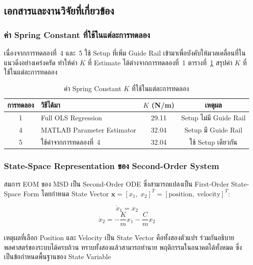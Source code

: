 \subsection{เอกสารและงานวิจัยที่เกี่ยวข้อง}

\subsubsection{ค่า Spring Constant ที่ใช้ในแต่ละการทดลอง}

เนื่องจากการทดลองที่~4 และ~5 ใช้ Setup ที่เพิ่ม Guide Rail
เข้ามาเพื่อบังคับให้มวลเคลื่อนที่ในแนวดิ่งอย่างเคร่งครัด
ทำให้ค่า $K$ ที่ Estimate ได้ต่างจากการทดลองที่~1
ตารางที่~\ref{tab:K_summary} สรุปค่า $K$ ที่ใช้ในแต่ละการทดลอง

\begin{table}[htbp]
\centering
\caption{ค่า Spring Constant $K$ ที่ใช้ในแต่ละการทดลอง}
\label{tab:K_summary}
\begin{tabular}{clcc}
\toprule
การทดลอง & วิธีได้มา & $K$ (N/m) & เหตุผล \\
\midrule
1 & Full OLS Regression & 29.11 & Setup ไม่มี Guide Rail \\
4 & MATLAB Parameter Estimator & 32.04 & Setup มี Guide Rail \\
5 & ใช้ค่าจากการทดลองที่~4 & 32.04 & ใช้ Setup เดียวกัน \\
\bottomrule
\end{tabular}
\end{table}

\subsubsection{State-Space Representation ของ Second-Order System}

สมการ EOM ของ MSD เป็น Second-Order ODE ซึ่งสามารถแปลงเป็น
First-Order State-Space Form โดยกำหนด State Vector
$\mathbf{x} = [x_1,\; x_2]^T = [\text{position},\; \text{velocity}]^T$:

\begin{equation}
    \dot{x}_1 = x_2
    \label{eq:ss_x1dot}
\end{equation}
\begin{equation}
    \dot{x}_2 = -\frac{K}{m} x_1 - \frac{C}{m} x_2
    \label{eq:ss_x2dot}
\end{equation}

เหตุผลที่เลือก Position และ Velocity เป็น State Vector คือทั้งสองตัวแปร
ร่วมกันอธิบายพลศาสตร์ของระบบได้ครบถ้วน ทราบทั้งสองแล้วสามารถทำนาย
พฤติกรรมในอนาคตได้ทั้งหมด ซึ่งเป็นข้อกำหนดพื้นฐานของ State Variable

